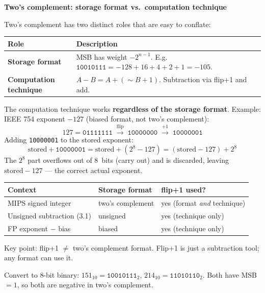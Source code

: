 \begin{flushright}
\begin{minipage}{0.92\linewidth}
\scriptsize
\textbf{Two's complement: storage format vs.\ computation technique}\par\smallskip
Two's complement has two distinct roles that are easy to conflate:

\smallskip
\begin{tabular}{@{}l l@{}}
\toprule
Role & Description \\
\midrule
\textbf{Storage format} &
  MSB has weight $-2^{n-1}$.
  E.g.\ $\texttt{10010111} = -128+16+4+2+1 = -105$. \\
\textbf{Computation technique} &
  $A - B = A + (\sim\!B + 1)$. Subtraction via flip+1 and add. \\
\bottomrule
\end{tabular}

\smallskip
The computation technique works \textbf{regardless of the storage format}.
Example: IEEE 754 exponent $- 127$ (biased format, not two's complement):
\[
  127 = \texttt{01111111}
  \;\xrightarrow{\text{flip}}\;
  \texttt{10000000}
  \;\xrightarrow{+1}\;
  \texttt{10000001}
\]
Adding \texttt{10000001} to the stored exponent:
\[
  \text{stored} + \texttt{10000001}
  = \text{stored} + (2^8 - 127)
  = (\text{stored} - 127) + 2^8
\]
The $2^8$ part overflows out of 8~bits (carry out) and is discarded,
leaving $\text{stored} - 127$ --- the correct actual exponent.

\smallskip
\begin{tabular}{@{}l l l@{}}
\toprule
Context & Storage format & flip+1 used? \\
\midrule
MIPS signed integer & two's complement & yes (format \textit{and} technique) \\
Unsigned subtraction (3.1) & unsigned & yes (technique only) \\
FP exponent $-$ bias & biased & yes (technique only) \\
\bottomrule
\end{tabular}

\smallskip
Key point: flip+1 $\ne$ two's complement format.
Flip+1 is just a subtraction tool; any format can use it.
\end{minipage}
\end{flushright}

\medskip
Convert to 8-bit binary:
$151_{10} = \texttt{10010111}_2$, \;
$214_{10} = \texttt{11010110}_2$.
Both have MSB $= 1$, so both are negative in two's complement.

